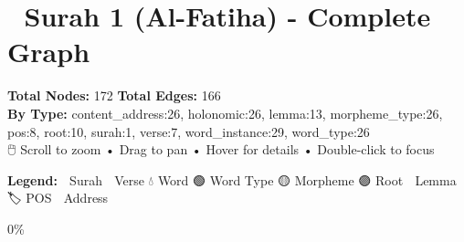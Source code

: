 \documentclass[12pt,a4paper]{article}
\begin{document}
\section{📖 Surah 1 (Al-Fatiha) - Complete
Graph}\label{surah-1-al-fatiha---complete-graph}

\textbf{Total Nodes:} 172 \textbar{} \textbf{Total Edges:} 166\\
\textbf{By Type:} content\_address:26, holonomic:26, lemma:13,
morpheme\_type:26, pos:8, root:10, surah:1, verse:7, word\_instance:29,
word\_type:26\\
{🖱️ Scroll to zoom • Drag to pan • Hover for details • Double-click to
focus}

\textbf{Legend:} 🔴 Surah \textbar{} 🔵 Verse \textbar{} 💧 Word
\textbar{} 🟢 Word Type \textbar{} 🟡 Morpheme \textbar{} 🟣 Root
\textbar{} 📝 Lemma \textbar{} 🏷️ POS \textbar{} 🔗 Address

\protect{}\label{mynetwork}

\protect{}\label{loadingBar}
\protect{}\label{text}
0\%

\protect{}\label{border}
\protect{}\label{bar}
\end{document}
